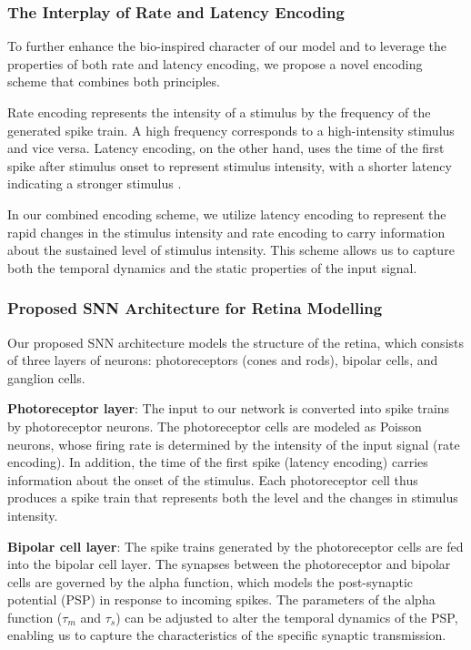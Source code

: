 \subsubsection{The Interplay of Rate and Latency Encoding}

To further enhance the bio-inspired character of our model and to leverage the properties of both rate and latency encoding, we propose a novel encoding scheme that combines both principles.

Rate encoding represents the intensity of a stimulus by the frequency of the generated spike train. A high frequency corresponds to a high-intensity stimulus and vice versa. Latency encoding, on the other hand, uses the time of the first spike after stimulus onset to represent stimulus intensity, with a shorter latency indicating a stronger stimulus \cite{thorpe2001spike}.

In our combined encoding scheme, we utilize latency encoding to represent the rapid changes in the stimulus intensity and rate encoding to carry information about the sustained level of stimulus intensity. This scheme allows us to capture both the temporal dynamics and the static properties of the input signal.

\subsubsection{Proposed SNN Architecture for Retina Modelling}

Our proposed SNN architecture models the structure of the retina, which consists of three layers of neurons: photoreceptors (cones and rods), bipolar cells, and ganglion cells.

\textbf{Photoreceptor layer}: The input to our network is converted into spike trains by photoreceptor neurons. The photoreceptor cells are modeled as Poisson neurons, whose firing rate is determined by the intensity of the input signal (rate encoding). In addition, the time of the first spike (latency encoding) carries information about the onset of the stimulus. Each photoreceptor cell thus produces a spike train that represents both the level and the changes in stimulus intensity.

\textbf{Bipolar cell layer}: The spike trains generated by the photoreceptor cells are fed into the bipolar cell layer. The synapses between the photoreceptor and bipolar cells are governed by the alpha function, which models the post-synaptic potential (PSP) in response to incoming spikes. The parameters of the alpha function ($\tau_m$ and $\tau_s$) can be adjusted to alter the temporal dynamics of the PSP, enabling us to capture the characteristics of the specific synaptic transmission.

